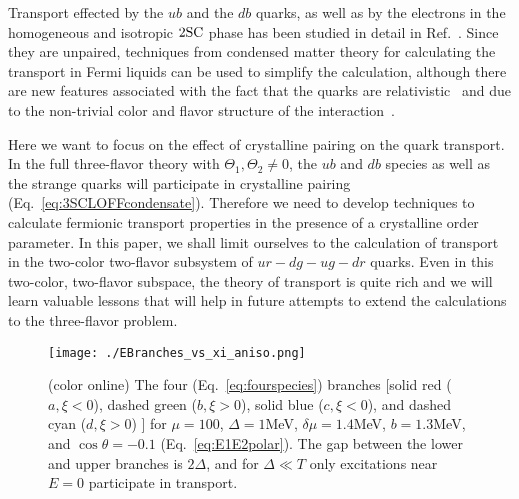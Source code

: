 \documentclass[10pt, aps, prd, superscriptaddress, nofootinbib, 
               amsmath, amssymb, twocolumn,
               preprintnumbers, showpacs,
               raggedbottom,
               floatfix]{revtex4-1}
\begin{document}
Transport effected by the $ub$ and the $db$ quarks, as well as by the electrons
in the homogeneous and isotropic ${\rm{2SC}}$ phase has been studied in detail
in Ref.~\cite{Alford:2014doa}. Since they are unpaired, techniques from
condensed matter theory for calculating the transport in Fermi liquids can be
used to simplify the calculation, although there are new features associated
with the fact that the quarks are relativistic~\cite{Baym:1990} and due to the
non-trivial color and flavor structure of the
interaction~\cite{Alford:2014doa}. 

Here we want to focus on the effect of crystalline pairing on the quark
transport. In the full three-flavor theory with $\Theta_1, \Theta_2\neq0$, the
$ub$ and $db$ species as well as the strange quarks will participate in
crystalline pairing (Eq.~\ref{eq:3SCLOFFcondensate}). Therefore we need to
develop techniques to calculate fermionic transport properties in the presence
of a crystalline order parameter. In this paper, we shall limit ourselves to the
calculation of transport in the two-color two-flavor subsystem of $ur-dg-ug-dr$
quarks. Even in this two-color, two-flavor subspace, the theory of transport is
quite rich and we will learn valuable lessons that will help in future attempts
to extend the calculations to the three-flavor problem.

\begin{figure}[tbp]
\texttt{[image: ./EBranches\_vs\_xi\_aniso.png]}
  \caption{(color online) The four (Eq.~\ref{eq:fourspecies})
  branches [solid red ($a, \xi<0$), dashed
  green ($b, \xi>0$), solid blue ($c, \xi<0$), and dashed cyan ($d, \xi>0$)
  ] for $\mu=100$, $\Delta=1$MeV, $\delta\mu=1.4$MeV, $b=1.3$MeV, and
  $\cos\theta=-0.1$ (Eq.~\ref{eq:E1E2polar}). The gap between the lower and
  upper branches is $2\Delta$, and for $\Delta\ll T$ only excitations near
  $E=0$ participate in transport.~\label{fig:EBranches}
}
\end{figure}
\end{document}
